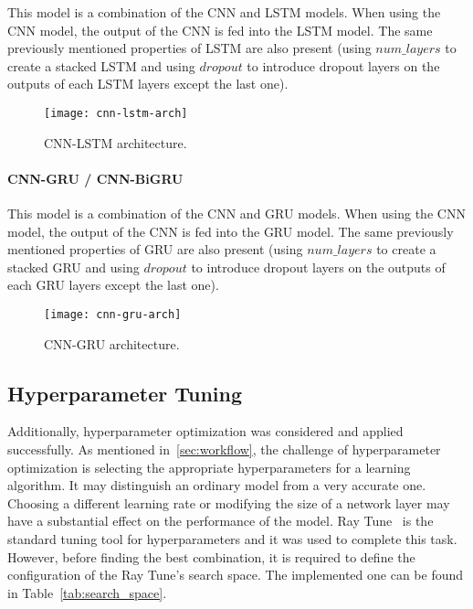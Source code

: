 This model is a combination of the \gls{CNN} and \gls{LSTM} models. When using the \gls{CNN} model, the output of the \gls{CNN} is fed into the \gls{LSTM} model. The same previously mentioned properties of \gls{LSTM} are also present (using $num\_layers$ to create a stacked \gls{LSTM} and using $dropout$ to introduce dropout layers on the outputs of each \gls{LSTM} layers except the last one).

\begin{figure}[htbp]
    \centering
    \texttt{[image: cnn-lstm-arch]}
    \caption{CNN-LSTM architecture.}
    \label{fig:cnn-lstm-arch}
\end{figure}

\paragraph{CNN-GRU / CNN-BiGRU}

This model is a combination of the \gls{CNN} and \gls{GRU} models. When using the \gls{CNN} model, the output of the \gls{CNN} is fed into the \gls{GRU} model. The same previously mentioned properties of \gls{GRU} are also present (using $num\_layers$ to create a stacked \gls{GRU} and using $dropout$ to introduce dropout layers on the outputs of each \gls{GRU} layers except the last one).

\begin{figure}[htbp]
    \centering
    \texttt{[image: cnn-gru-arch]}
    \caption{CNN-GRU architecture.}
    \label{fig:cnn-gru-arch}
\end{figure}

\subsection{Hyperparameter Tuning}

Additionally, hyperparameter optimization was considered and applied successfully. As mentioned in~\ref{sec:workflow}, the challenge of hyperparameter optimization is selecting the appropriate hyperparameters for a learning algorithm. It may distinguish an ordinary model from a very accurate one. Choosing a different learning rate or modifying the size of a network layer may have a substantial effect on the performance of the model. Ray Tune~\cite{Liaw2018Tune:Training} is the standard tuning tool for hyperparameters and it was used to complete this task. However, before finding the best combination, it is required to define the configuration of the Ray Tune's search space. The implemented one can be found in Table~\ref{tab:search_space}.

